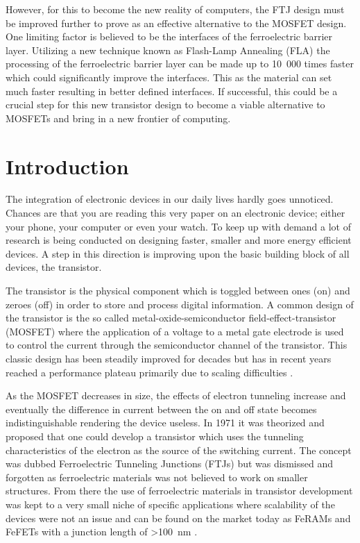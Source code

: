\documentclass[11pt,twoside]{eitExjobb}
\begin{document}
However, for this to become the new reality of computers, the FTJ design must be
improved further to prove as an effective alternative to the MOSFET design. One
limiting factor is believed to be the interfaces of the ferroelectric barrier
layer. Utilizing a new technique known as Flash-Lamp Annealing (FLA) the
processing of the ferroelectric barrier layer can be made up to 10 000 times
faster which could significantly improve the interfaces. This as the material
can set much faster resulting in better defined interfaces. If successful, this
could be a crucial step for this new transistor design to become a viable
alternative to MOSFETs and bring in a new frontier of computing.

\tableofcontents
\listoffigures
\listoftables
\cleardoublepage{}
\mainmatter{}
\chapter{Introduction}\label{ch:intro}

The integration of electronic devices in our daily lives hardly goes unnoticed.
Chances are that you are reading this very paper on an electronic device;
either your phone, your computer or even your watch. To keep up with demand a
lot of research is being conducted on designing faster, smaller and more energy
efficient devices. A step in this direction is improving upon the basic
building block of all devices, the transistor.

The transistor is the physical component which is toggled between ones (on) and
zeroes (off) in order to store and process digital information. A common design
of the transistor is the so called metal-oxide-semiconductor
field-effect-transistor (MOSFET) where the application of a voltage to a metal gate
electrode is used to control the current through the semiconductor channel of the
transistor. This classic design has been steadily improved for decades but has
in recent years reached a performance plateau primarily due to scaling
difficulties \cite{ratnech2021advancement}.

As the MOSFET decreases in size, the effects of electron tunneling increase and
eventually the difference in current between the on and off state becomes
indistinguishable rendering the device useless. In 1971 it was theorized and
proposed that one could develop a transistor which uses the tunneling
characteristics of the electron as the source of the switching current. The
concept was dubbed Ferroelectric Tunneling Junctions (FTJs) but was dismissed
and forgotten as ferroelectric materials was not believed to work on smaller
structures. From there the use of ferroelectric materials in transistor
development was kept to a very small niche of specific applications where
scalability of the devices were not an issue and can be found on the market
today as FeRAMs and FeFETs with a junction length of >\SI{100}{\nano\meter}
\cite{garcia2014ferroelectric, mikolajick2020past}.
\end{document}
